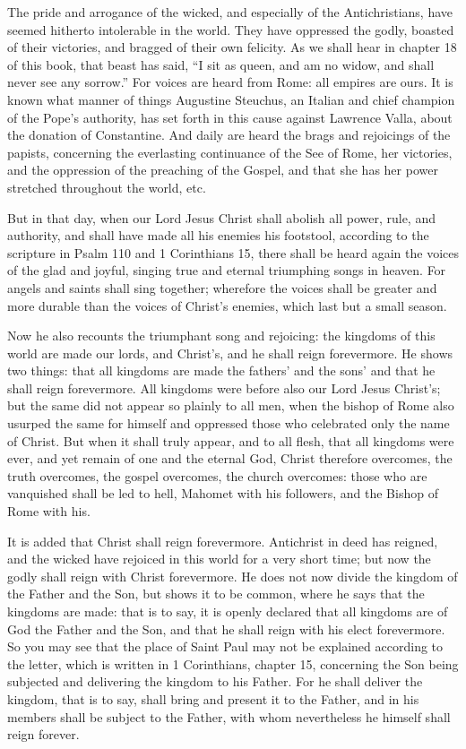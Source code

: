 The pride and arrogance of the wicked, and especially of the Antichristians, have seemed hitherto intolerable in the world. They have oppressed the godly, boasted of their victories, and bragged of their own felicity. As we shall hear in chapter 18 of this book, that beast has said, “I sit as queen, and am no widow, and shall never see any sorrow.” For voices are heard from Rome: all empires are ours. It is known what manner of things Augustine Steuchus, an Italian and chief champion of the Pope’s authority, has set forth in this cause against Lawrence Valla, about the donation of Constantine. And daily are heard the brags and rejoicings of the papists, concerning the everlasting continuance of the See of Rome, her victories, and the oppression of the preaching of the Gospel, and that she has her power stretched throughout the world, etc.

But in that day, when our Lord Jesus Christ shall abolish all power, rule, and authority, and shall have made all his enemies his footstool, according to the scripture in Psalm 110 and 1 Corinthians 15, there shall be heard again the voices of the glad and joyful, singing true and eternal triumphing songs in heaven. For angels and saints shall sing together; wherefore the voices shall be greater and more durable than the voices of Christ’s enemies, which last but a small season.

Now he also recounts the triumphant song and rejoicing: the kingdoms of this world are made our lords, and Christ’s, and he shall reign forevermore. He shows two things: that all kingdoms are made the fathers’ and the sons’ and that he shall reign forevermore. All kingdoms were before also our Lord Jesus Christ’s; but the same did not appear so plainly to all men, when the bishop of Rome also usurped the same for himself and oppressed those who celebrated only the name of Christ. But when it shall truly appear, and to all flesh, that all kingdoms were ever, and yet remain of one and the eternal God, Christ therefore overcomes, the truth overcomes, the gospel overcomes, the church overcomes: those who are vanquished shall be led to hell, Mahomet with his followers, and the Bishop of Rome with his.

It is added that Christ shall reign forevermore. Antichrist in deed has reigned, and the wicked have rejoiced in this world for a very short time; but now the godly shall reign with Christ forevermore. He does not now divide the kingdom of the Father and the Son, but shows it to be common, where he says that the kingdoms are made: that is to say, it is openly declared that all kingdoms are of God the Father and the Son, and that he shall reign with his elect forevermore. So you may see that the place of Saint Paul may not be explained according to the letter, which is written in 1 Corinthians, chapter 15, concerning the Son being subjected and delivering the kingdom to his Father. For he shall deliver the kingdom, that is to say, shall bring and present it to the Father, and in his members shall be subject to the Father, with whom nevertheless he himself shall reign forever.

